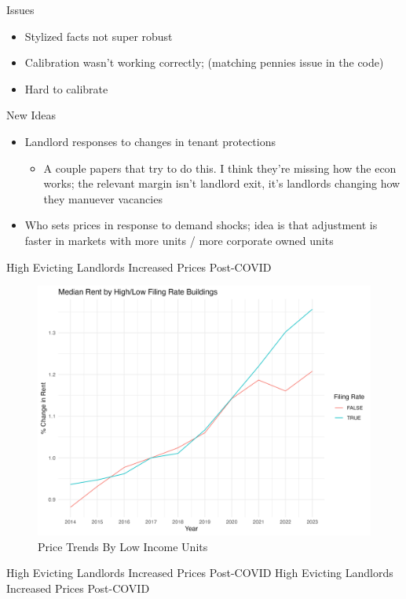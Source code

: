 \documentclass[10pt, xcolor=dvipsnames]{beamer}
\begin{document}
\begin{frame}{Issues}
    \begin{itemize}
        \item Stylized facts not super robust
        \item Calibration wasn't working correctly; (matching pennies issue in the code)
        \item Hard to calibrate
    \end{itemize}
    
\end{frame}

\begin{frame}{New Ideas}
    \begin{itemize}
        \item Landlord responses to changes in tenant protections
        \begin{itemize}
            \item A couple papers that try to do this. I think they're missing how the econ works; the relevant margin isn't landlord exit, it's landlords changing how they manuever vacancies
        \end{itemize}
        \item Who sets prices in response to demand shocks; idea is that adjustment is faster in markets with more units / more corporate owned units
    \end{itemize}
    
\end{frame}

\begin{frame}{High Evicting Landlords Increased Prices Post-COVID}
    \begin{figure}
        \centering
        \includegraphics[width=0.5\linewidth]{figs/mean_price_quintile.png}
        \caption{Price Trends By Low Income Units}
        \label{fig:mean-price-quintile}
    \end{figure}
\end{frame}

\begin{frame}{High Evicting Landlords Increased Prices Post-COVID}
    High Evicting Landlords Increased Prices Post-COVID
    \tiny
    
    
\end{frame}
\end{document}
